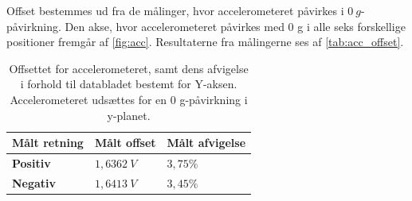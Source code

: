 Offset bestemmes ud fra de målinger, hvor accelerometeret påvirkes i $0~g$-påvirkning. Den akse, hvor accelerometeret påvirkes med 0 g i alle seks forskellige positioner fremgår af \autoref{fig:acc}. Resultaterne fra målingerne ses af \autoref{tab:acc_offset}. 

\begin{table}[H]
	\centering
	\begin{tabular}{|l|l|l|} \hline
\textbf{Målt retning} & \textbf{Målt offset} & \textbf{Målt afvigelse} \\ \hline
    \textbf{Positiv} 			& $1,6362~V$	& $3,75 \%$    \\ \hline
    \textbf{Negativ} 			& $1,6413~V$	& $3,45 \%$	\\ \hline
	\end{tabular}
	\caption{Offsettet for accelerometeret, samt dens afvigelse i forhold til databladet bestemt for Y-aksen. Accelerometeret udsættes for en 0 g-påvirkning i y-planet.}
	\label{tab:acc_offset}
\end{table}

